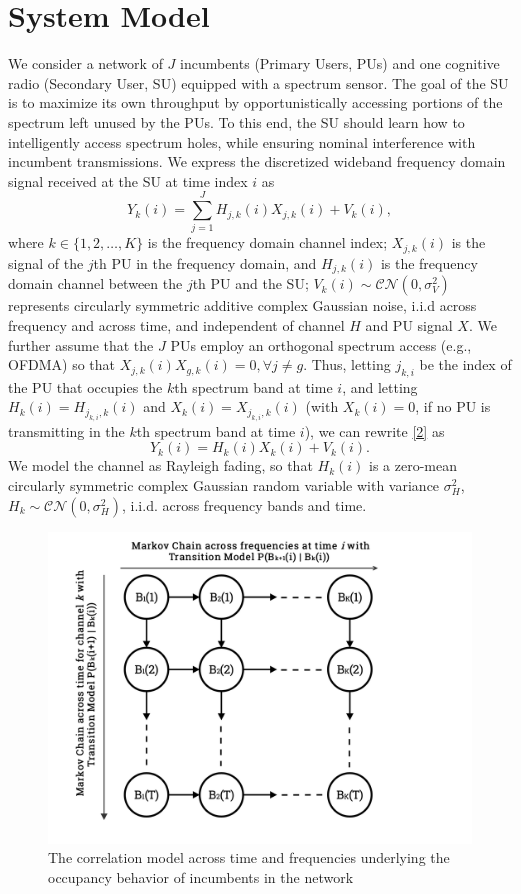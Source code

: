 \documentclass[10pt,twocolumn]{IEEEtran}
\begin{document}
\section{System Model}\label{II}
We consider a network of $J$ incumbents (Primary Users, PUs) and one cognitive radio (Secondary User, SU) equipped with a spectrum sensor. The goal of the SU is to maximize its own throughput by opportunistically accessing portions of the spectrum left unused by the PUs. To this end, the SU should learn how to intelligently access spectrum holes, while ensuring nominal interference with incumbent transmissions.
We express the discretized wideband frequency domain signal received at the SU
at time index $i$ as
\begin{equation}\label{2}
    Y_k(i) = \sum_{j=1}^{J} H_{j,k}(i)X_{j,k}(i) + V_k(i),
\end{equation}
where  $k {\in} \{1,2,\dots,K\}$
is the frequency domain channel index; $X_{j,k}(i)$ is the signal of the $j$th PU in the frequency domain, and $H_{j,k}(i)$ is the frequency domain channel between the $j$th PU and the SU; $V_k(i) {\sim} \mathcal{CN}(0,\sigma_V^2)$ represents circularly symmetric additive complex Gaussian noise, i.i.d across frequency and across time, and independent of channel $H$ and PU signal $X$. We further assume that the $J$ PUs employ an orthogonal spectrum access (e.g., OFDMA) so that $X_{j,k}(i)X_{g,k}(i){=}0, \forall j{\neq}g$. Thus, letting $j_{k,i}$ be the index of the PU that occupies the $k$th spectrum band at time $i$, and letting  $H_{k}(i){=}H_{j_{k,i},k}(i)$ and $X_{k}(i){=}X_{j_{k,i},k}(i)$ (with $X_{k}(i){=}0$, if no PU is transmitting in the $k$th spectrum band at time $i$), we can rewrite \eqref{2} as 
\begin{equation}\label{3}
    Y_k(i) = H_{k}(i)X_{k}(i) + V_k(i).
\end{equation}
We model the channel as Rayleigh fading, so that $H_{k}(i)$ is a zero-mean circularly symmetric complex Gaussian random variable with variance $\sigma_H^2$, $H_k {\sim} \mathcal{CN}(0,\sigma_H^2)$, i.i.d. across frequency bands and time.
\begin{figure}
    \centering
    \includegraphics[width=0.6\linewidth]{MarkovChainsVisualization}
    \vspace{-5mm}
    \caption{The correlation model across time and frequencies underlying the occupancy behavior of incumbents in the network}
    \vspace{-5mm}
    \label{fig:1}
\end{figure}
\end{document}
